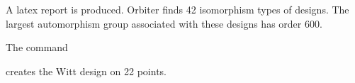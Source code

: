 
A latex report is produced.
Orbiter finds 42 isomorphism types of designs. 
The largest automorphism group associated with these designs has order 600.


\bigskip


The command


creates the Witt design on 22 points.


\bigskip






